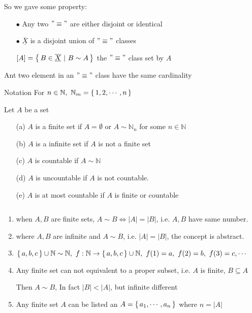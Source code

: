 So we gave some property:

\begin{enumerate}
	\item[$\bullet$] Any two $"\equiv"$ are either disjoint or identical 
	\item[$\bullet$] $\overline{\underline{X}}$ is a disjoint union of $"\equiv "$ classes
	
	$[A] = \left\{ \,B \in \overline{\underline{X}}~|~B \sim A \,\right\}$ the $"\equiv "$ class set by $A$
\end{enumerate}

Ant two element in an $"\equiv "$ class have the same cardinality

Notation For $n \in \mathbb N,~\mathbb N_{m} = \left\{ \,1,2,\cdots,n \,\right\}$

\begin{defn}
	Let $A$ be a set
	
	\begin{enumerate}
		\item[(a)] $A$ is a finite set if $A = \emptyset$ or $A \sim \mathbb N_n$ for some $n \in \mathbb N$
		\item[(b)] $A$ is a infinite set if $A$ is not a finite set 
		\item[(c)] $A$ is countable if $A \sim \mathbb N$
		\item[(d)] $A$ is uncountable if $A$ is not countable.
		\item[(e)] $A$ is at most countable if $A$ is finite or countable
	\end{enumerate}
\end{defn}

\begin{rmk*} $ $
	\begin{enumerate}
		\item when $A,B$ are finite sets, $A \sim B \Leftrightarrow |A| = |B|$, i.e. $A,B$ have same number.
		\item where $A,B$ are infinite and $A \sim B$, i.e. $|A| = |B|$, the concept is abstract.
		\item $\left\{ \,a,b,c \,\right\} \cup \mathbb N \sim \mathbb N,~f:\mathbb N \rightarrow \left\{ \,a,b,c \,\right\} \cup \mathbb N,~f(1) = a,~f(2) = b,~f(3) = c,\cdots$
		\item Any finite set can not equivalent to a proper subset, i.e. $A$ is finite, $B \subseteq A$
		
		Then $A \sim B$, In fact $|B| < |A|$, but infinite different
		\item Any finite set $A$ can be listed an $A = \left\{ \,a_1,\cdots,a_n \,\right\}$ where $n = |A|$
	\end{enumerate}
\end{rmk*}

